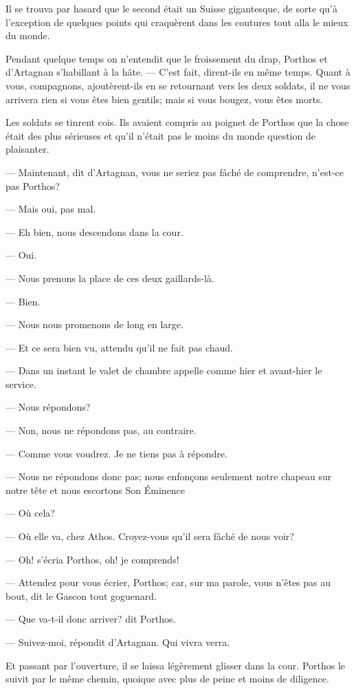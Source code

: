 Il se trouva par hasard que le second était un Suisse gigantesque, de sorte qu'à l'exception de quelques points qui craquèrent dans les coutures tout alla le mieux du monde.

Pendant quelque temps on n'entendit que le froissement du drap, Porthos et d'Artagnan s'habillant à la hâte.
— C'est fait, dirent-ils en même temps. Quant à vous, compagnons, ajoutèrent-ils en se retournant vers les deux soldats, il ne vous arrivera rien si vous êtes bien gentils; mais si vous bougez, vous êtes morts.

Les soldats se tinrent cois. Ils avaient compris au poignet de Porthos que la chose était des plus sérieuses et qu'il n'était pas le moins du monde question de plaisanter.

— Maintenant, dit d'Artagnan, vous ne seriez pas fâché de comprendre, n'est-ce pas Porthos?

— Mais oui, pas mal.

— Eh bien, nous descendons dans la cour.

— Oui.

— Nous prenons la place de ces deux gaillards-là.

— Bien.

— Nous nous promenons de long en large.

— Et ce sera bien vu, attendu qu'il ne fait pas chaud.

— Dans un instant le valet de chambre appelle comme hier et avant-hier le service.

— Nous répondons?

— Non, nous ne répondons pas, au contraire.

— Comme vous voudrez. Je ne tiens pas à répondre.

— Nous ne répondons donc pas; nous enfonçons seulement notre chapeau sur notre tête et nous escortons Son Éminence

— Où cela?

— Où elle va, chez Athos. Croyez-vous qu'il sera fâché de nous voir?

— Oh! s'écria Porthos, oh! je comprends!

— Attendez pour vous écrier, Porthos; car, sur ma parole, vous n'êtes pas au bout, dit le Gascon tout goguenard.

— Que va-t-il donc arriver? dit Porthos.

— Suivez-moi, répondit d'Artagnan. Qui vivra verra.

Et passant par l'ouverture, il se laissa légèrement glisser dans la cour. Porthos le suivit par le même chemin, quoique avec plus de peine et moins de diligence.

